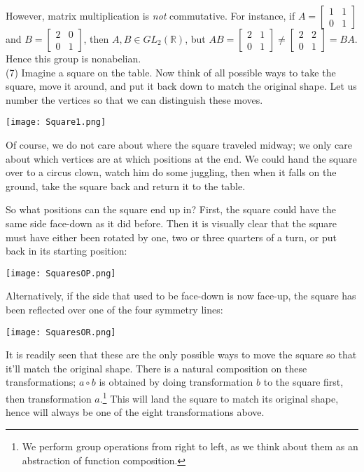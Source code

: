 \documentclass[leqno]{book}
\begin{document}
However, matrix multiplication is \emph{not} commutative.  For instance, if $A=\begin{bmatrix}1&1\\0&1\end{bmatrix}$ and $B=\begin{bmatrix}2&0\\0&1\end{bmatrix}$, then $A,B\in GL_2(\mathbb R)$, but $AB=\begin{bmatrix}2&1\\0&1\end{bmatrix}\ne\begin{bmatrix}2&2\\0&1\end{bmatrix}=BA$.  Hence this group is nonabelian.\\

(7) Imagine a square on the table.  Now think of all possible ways to take the square, move it around, and put it back down to match the original shape.  Let us number the vertices so that we can distinguish these moves.
\begin{center}\texttt{[image: Square1.png]}\end{center}

Of course, we do not care about where the square traveled midway; we only care about which vertices are at which positions at the end.  We could hand the square over to a circus clown, watch him do some juggling, then when it falls on the ground, take the square back and return it to the table.

So what positions can the square end up in?  First, the square could have the same side face-down as it did before.  Then it is visually clear that the square must have either been rotated by one, two or three quarters of a turn, or put back in its starting position:
\begin{center}\texttt{[image: SquaresOP.png]}\end{center}

Alternatively, if the side that used to be face-down is now face-up, the square has been reflected over one of the four symmetry lines:
\begin{center}\texttt{[image: SquaresOR.png]}\end{center}

It is readily seen that these are the only possible ways to move the square so that it'll match the original shape.  There is a natural composition on these transformations; $a\circ b$ is obtained by doing transformation $b$ to the square first, then transformation $a$.\footnote{We perform group operations from right to left, as we think about them as an abstraction of function composition.}  This will land the square to match its original shape, hence will always be one of the eight transformations above.
\end{document}
